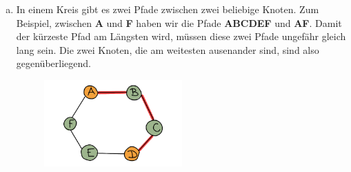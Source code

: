 \begin{enumerate}[(a)]
\item In einem Kreis gibt es zwei Pfade zwischen zwei beliebige Knoten. Zum Beispiel, zwischen \textbf{A} und \textbf{F} haben wir die Pfade \textbf{ABCDEF} und \textbf{AF}. Damit der kürzeste Pfad am Längsten wird, müssen diese zwei Pfade ungefähr gleich lang sein. Die zwei Knoten, die am weitesten ausenander sind, sind also gegenüberliegend.
\begin{figure}[H]
    \centering
    \includegraphics[width=0.5\textwidth]{Pictures/SP/abstand_kreis6.png}
\end{figure}
\end{enumerate}

